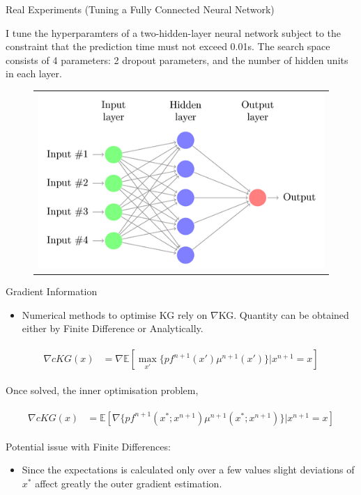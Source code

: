 \documentclass{beamer}
\begin{document}
\begin{frame}{Real Experiments (Tuning a Fully Connected Neural Network)}

I tune the hyperparamters of a two-hidden-layer neural network subject to
the constraint that the prediction time must not exceed 0.01s. The search space consists of 4 parameters: 2 dropout parameters, and the number of hidden units in each layer.

\begin{figure}
	
	\centering
	\begin{tabular}{c}
		\includegraphics[width=0.7\linewidth]{FC_NN.png}\\
	\end{tabular}	
\end{figure}
\end{frame}




\begin{frame}{Gradient Information}

\begin{itemize}
	\item Numerical methods to optimise KG rely on $\nabla$KG. Quantity can be obtained either by Finite Difference or Analytically. 
\end{itemize}

\begin{align*}
\begin{split}
\nabla cKG(x) &= \nabla \mathbb{E}[\max_{x'}\{pf^{n+1}(x')\mu^{n+1}(x')\}|x^{n+1}=x]
\end{split}
\end{align*}

Once solved, the inner optimisation problem, 

\begin{align*}
\begin{split}
\nabla cKG(x) &= \mathbb{E}[\nabla \{pf^{n+1}(x^{*};x^{n+1})\mu^{n+1}(x^{*};x^{n+1})\}|x^{n+1}=x]
\end{split}
\end{align*}

Potential issue with Finite Differences:
\begin{itemize}
	\item Since the expectations is calculated only over a few values slight deviations of $x^{*}$ affect greatly the outer gradient estimation. 
\end{itemize}

\end{frame}
	
\end{document}
